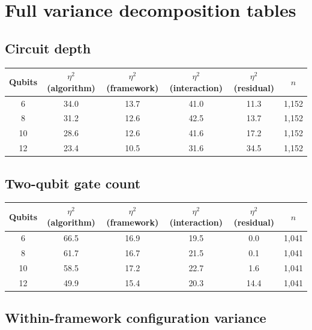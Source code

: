 \documentclass[11pt,a4paper]{article}
\begin{document}

\appendix

\section{Full variance decomposition tables}

\subsection{Circuit depth}

\begin{table}[H]
\centering
\begin{tabular}{cccccc}
\toprule
Qubits & $\eta^2$(algorithm) & $\eta^2$(framework) & $\eta^2$(interaction) & $\eta^2$(residual) & $n$ \\
\midrule
6  & 34.0 & 13.7 & 41.0 & 11.3 & 1{,}152 \\
8  & 31.2 & 12.6 & 42.5 & 13.7 & 1{,}152 \\
10 & 28.6 & 12.6 & 41.6 & 17.2 & 1{,}152 \\
12 & 23.4 & 10.5 & 31.6 & 34.5 & 1{,}152 \\
\bottomrule
\end{tabular}
\end{table}

\subsection{Two-qubit gate count}

\begin{table}[H]
\centering
\begin{tabular}{cccccc}
\toprule
Qubits & $\eta^2$(algorithm) & $\eta^2$(framework) & $\eta^2$(interaction) & $\eta^2$(residual) & $n$ \\
\midrule
6  & 66.5 & 16.9 & 19.5 & 0.0 & 1{,}041 \\
8  & 61.7 & 16.7 & 21.5 & 0.1 & 1{,}041 \\
10 & 58.5 & 17.2 & 22.7 & 1.6 & 1{,}041 \\
12 & 49.9 & 15.4 & 20.3 & 14.4 & 1{,}041 \\
\bottomrule
\end{tabular}
\end{table}

\subsection{Within-framework configuration variance}
\end{document}
